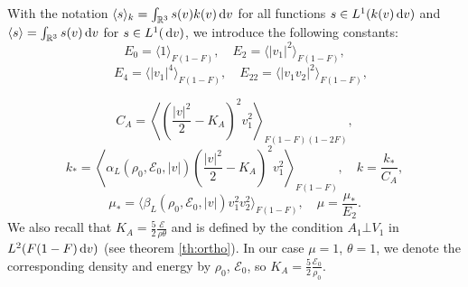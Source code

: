With the notation $\langle s\rangle_k = \int_{\mathbb {R}^3} s(v)k(v){\,\mathrm{d} v}$ for all functions $s\in L^1(k(v){\,\mathrm{d} v})$ and $\langle s\rangle = \int_{\mathbb {R}^3} s(v) {\,\mathrm{d} v}$ for $s\in L^1({\,\mathrm{d} v})$, we introduce the following constants:
\[E_0=\langle1\rangle_{F(1-F)},\quad E_2=\langle |v_1|^2\rangle_{F(1-F)},\]\[
\quad E_4=\langle |v_1|^4\rangle_{F(1-F)},\quad E_{22}=\langle |v_1v_2|^2\rangle_{F(1-F)},\]

\[C_A=  \left\langle   \left(\frac{|v|^2}{2}-K_A\right)^2 v_1^2
\right\rangle_{F(1-F)(1-2F)},\]
\[k_\ast=\left\langle \alpha_L(\rho_0,\mathcal E_0,|v|) \left( \frac{|v|^2}{2}-K_A\right)^2v_1^2  
\right\rangle_{F(1-F)},\quad k =\frac{k_*}{C_A},\]
\[\mu_\ast=\langle \beta_L(\rho_0,\mathcal E_0,|v|) v_1^2v_2^2
\rangle_{F(1-F)},\quad \mu=\frac{\mu_*}{E_2}.\]
We also recall  that $K_A=\frac 52\frac{\mathcal E}{\rho\theta}$ and is defined by the condition $A_1\bot V_1$ in $L^2(F(1-F){\,\mathrm{d} v})$ (see theorem \ref{th:ortho}). In our case $\mu=1$, $\theta=1$, we denote the corresponding density and energy by $\rho_0$, $\mathcal E_0$, so $K_A=\frac 52\frac{\mathcal E_0}{\rho_0}$.
